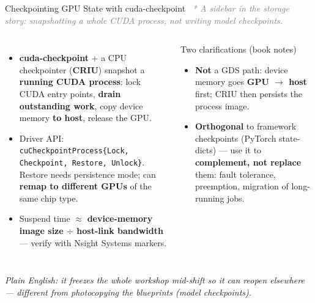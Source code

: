 \documentclass[aspectratio=169]{beamer}
\newcommand{\kw}[1]{\textbf{\textcolor{kwblue}{#1}}}
\newcommand{\pe}[1]{\par{\setlength{\fboxsep}{2.5pt}\noindent\colorbox{navy!9}{\parbox{\dimexpr\textwidth-5pt\relax}{\footnotesize\itshape Plain English: #1}}}}
\newcommand{\bridge}[1]{{\footnotesize\itshape\textcolor{gray}{#1}}\par}
\begin{document}
\begin{frame}{Checkpointing GPU State with cuda-checkpoint\ {\normalsize *}}
  \bridge{* A sidebar in the storage story: snapshotting a whole CUDA process, not writing model checkpoints.}
  \begin{columns}[t]
    \begin{itemize}\small
      \item \kw{cuda-checkpoint} + a CPU checkpointer (\kw{CRIU}) snapshot a \kw{running
            CUDA process}: lock CUDA entry points, \kw{drain outstanding work}, copy device
            memory \kw{to host}, release the GPU.
      \item Driver API: \texttt{cuCheckpointProcess\{Lock, Checkpoint, Restore, Unlock\}}.
            Restore needs persistence mode; can \kw{remap to different GPUs} of the same
            chip type.
      \item Suspend time $\approx$ \kw{device-memory image size $\div$ host-link bandwidth}
            --- verify with Nsight Systems markers.
    \end{itemize}
    \begin{block}{Two clarifications (book notes)}
      \small
      \begin{itemize}\small
        \item \kw{Not} a GDS path: device memory goes \kw{GPU $\to$ host} first;
              CRIU then persists the process image.
        \item \kw{Orthogonal} to framework checkpoints (PyTorch state-dicts) ---
              use it to \kw{complement, not replace} them: fault tolerance,
              preemption, migration of long-running jobs.
      \end{itemize}
    \end{block}
  \end{columns}
  \pe{it freezes the whole workshop mid-shift so it can reopen elsewhere --- different from photocopying the blueprints (model checkpoints).}
\end{frame}
\end{document}
